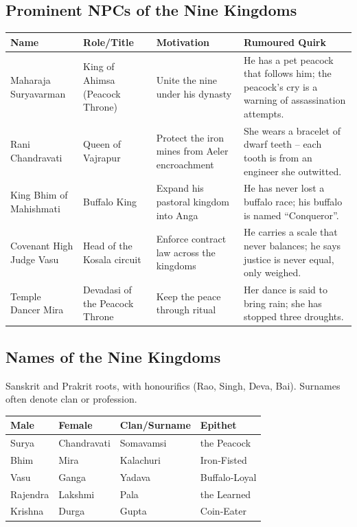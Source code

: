 \documentclass[11pt]{book}
\begin{document}
\subsection*{Prominent NPCs of the Nine Kingdoms}
\begin{longtable}{|p{}|p{}|p{}|p{}|}
\hline
\textbf{Name} & \textbf{Role/Title} & \textbf{Motivation} & \textbf{Rumoured Quirk} \\
\hline
Maharaja Suryavarman & King of Ahimsa (Peacock Throne) & Unite the nine under his dynasty & He has a pet peacock that follows him; the peacock’s cry is a warning of assassination attempts. \\
\hline
Rani Chandravati & Queen of Vajrapur & Protect the iron mines from Aeler encroachment & She wears a bracelet of dwarf teeth – each tooth is from an engineer she outwitted. \\
\hline
King Bhim of Mahishmati & Buffalo King & Expand his pastoral kingdom into Anga & He has never lost a buffalo race; his buffalo is named “Conqueror”. \\
\hline
Covenant High Judge Vasu & Head of the Kosala circuit & Enforce contract law across the kingdoms & He carries a scale that never balances; he says justice is never equal, only weighed. \\
\hline
Temple Dancer Mira & Devadasi of the Peacock Throne & Keep the peace through ritual & Her dance is said to bring rain; she has stopped three droughts. \\
\hline
\end{longtable}

\subsection*{Names of the Nine Kingdoms}
Sanskrit and Prakrit roots, with honourifics (Rao, Singh, Deva, Bai). Surnames often denote clan or profession.

\begin{longtable}{|p{}|p{}|p{}|p{}|}
\hline
\textbf{Male} & \textbf{Female} & \textbf{Clan/Surname} & \textbf{Epithet} \\
\hline
Surya & Chandravati & Somavamsi & the Peacock \\
\hline
Bhim & Mira & Kalachuri & Iron‑Fisted \\
\hline
Vasu & Ganga & Yadava & Buffalo‑Loyal \\
\hline
Rajendra & Lakshmi & Pala & the Learned \\
\hline
Krishna & Durga & Gupta & Coin‑Eater \\
\hline
\end{longtable}
\end{document}
